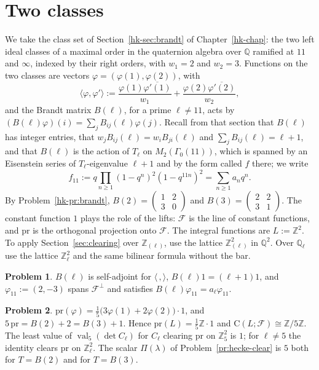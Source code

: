 \documentclass[reqno]{amsart}
\newcounter{chap}
\theoremstyle{definition}
\newtheorem{problem}{Problem}[section]
\newcommand{\Z}{\mathbb{Z}}
\newcommand{\Q}{\mathbb{Q}}
\newcommand{\Cg}{\mathrm{C}}
\newcommand{\pr}{\mathrm{pr}}
\newcommand{\val}{\operatorname{val}}
\begin{document}
\section{Two classes}\label{sec:eleven}

We take the class set of Section~\ref{hk-sec:brandt} of Chapter~\ref{hk-chap}: the two left ideal classes of a maximal order in the quaternion algebra over \(\Q\) ramified at \(11\) and \(\infty\), indexed by their right orders, with \(w_1 = 2\) and \(w_2 = 3\).  Functions on the two classes are vectors \(\varphi = (\varphi(1), \varphi(2))\), with
\[
  \langle \varphi, \varphi' \rangle := \frac{\varphi(1)\overline{\varphi'(1)}}{w_1} + \frac{\varphi(2)\overline{\varphi'(2)}}{w_2} ,
\]
and the Brandt matrix \(B(\ell)\), for a prime \(\ell \ne 11\), acts by \((B(\ell)\varphi)(i) = \sum_j B_{ij}(\ell)\varphi(j)\).  Recall from that section that \(B(\ell)\) has integer entries, that \(w_jB_{ij}(\ell) = w_iB_{ji}(\ell)\) and \(\sum_j B_{ij}(\ell) = \ell + 1\), and that \(B(\ell)\) is the action of \(T_\ell\) on \(M_2(\Gamma_0(11))\), which is spanned by an Eisenstein series of \(T_\ell\)-eigenvalue \(\ell + 1\) and by the form called \(f\) there; we write
\[
  f_{11} := q\prod_{n \ge 1}(1-q^n)^2(1-q^{11n})^2 = \sum_{n \ge 1} a_n q^n .
\]
By Problem~\ref{hk-pr:brandt}, \(B(2) = \begin{pmatrix} 1 & 2 \\ 3 & 0 \end{pmatrix}\) and \(B(3) = \begin{pmatrix} 2 & 2 \\ 3 & 1 \end{pmatrix}\).  The constant function \(1\) plays the role of the lifts: \(\mathcal F\) is the line of constant functions, and \(\pr\) is the orthogonal projection onto \(\mathcal F\).  The integral functions are \(L := \Z^2\).  To apply Section~\ref{sec:clearing} over \(\Z_{(\ell)}\), use the lattice \(\Z_{(\ell)}^2\) in \(\Q^2\).  Over \(\Q_\ell\) use the lattice \(\Z_\ell^2\) and the same bilinear formula without the bar.

\begin{problem}\label{pr:eleven-adjoint}
\(B(\ell)\) is self-adjoint for \(\langle\,,\rangle\), \(B(\ell)1 = (\ell + 1)1\), and \(\varphi_{11} := (2, -3)\) spans \(\mathcal F^\perp\) and satisfies \(B(\ell)\varphi_{11} = a_\ell\varphi_{11}\).
\end{problem}

\begin{problem}\label{pr:eleven-pr}
\(\pr(\varphi) = \frac15\bigl(3\varphi(1) + 2\varphi(2)\bigr)\cdot 1\), and \(5\,\pr = B(2) + 2 = B(3) + 1\).  Hence \(\pr(L) = \frac15\Z\cdot 1\) and \(\Cg(L; \mathcal F) \cong \Z/5\Z\).  The least value of \(\val_5(\det C_\ell)\) for \(C_\ell\) clearing \(\pr\) on \(\Z_5^2\) is \(1\); for \(\ell \ne 5\) the identity clears \(\pr\) on \(\Z_\ell^2\).  The scalar \(\Pi(\lambda)\) of Problem~\ref{pr:hecke-clear} is \(5\) both for \(T = B(2)\) and for \(T = B(3)\).
\end{problem}
\end{document}
